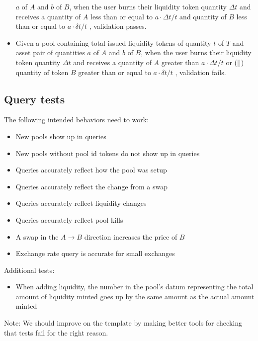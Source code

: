 \documentclass{article}
\begin{document}
\begin{itemize}
	      $a$ of $A$ and $b$ of $B$, when the user burns
	      their liquidity token quantity $\Delta t$ and receives a quantity of $A$ less than or equal to
	      $ a \cdot \Delta t/t $ and quantity of $B$ less than or equal to $ a \cdot \delta t/t $
	      , validation passes.
	\item Given a pool containing total issued liquidity tokens of quantity $t$ of $T$ and asset
	      pair of quantities $a$ of $A$ and $b$ of $B$, when the user burns
	      their liquidity token quantity $\Delta t$ and receives a quantity of $A$ greater than
	      $ a \cdot \Delta t/t $ or (||) quantity of token $B$ greater than or equal to $ a \cdot \delta t/t $
	      , validation fails.
\end{itemize}

\subsection*{Query tests}

The following intended behaviors need to work:
\begin{itemize}
	\item New pools show up in queries
	\item New pools without pool id tokens do not show up in queries
	\item Queries accurately reflect how the pool was setup
	\item Queries accurately reflect the change from a swap
	\item Queries accurately reflect liquidity changes
	\item Queries accurately reflect pool kills
	\item A swap in the $A \rightarrow B$ direction increases the price of $B$
	\item Exchange rate query is accurate for small exchanges
\end{itemize}

Additional tests:
\begin{itemize}
	\item When adding liquidity, the number in the pool's datum representing the
    total amount of liquidity minted goes up by the same amount as the actual amount minted
\end{itemize}

Note: We should improve on the template by making better tools for checking that tests fail for the right reason.
\end{document}
